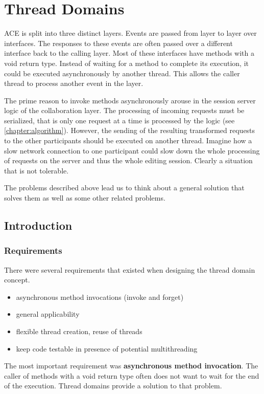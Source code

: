 \chapter{Thread Domains}

ACE is split into three distinct layers. Events are passed from layer to
layer over interfaces. The responses to these events are often passed over
a different interface back to the calling layer. Most of these interfaces
have methods with a void return type. Instead of waiting for a method
to complete its execution, it could be executed asynchronously by
another thread. This allows the caller thread to process another event
in the layer.

The prime reason to invoke methods asynchronously arouse in the session server
logic of the collaboration layer. The processing of incoming requests
must be serialized, that is only one request at a time is processed by
the logic (see \ref{chapter:algorithm}). However, the sending of the
resulting transformed requests to the other participants should be executed
on another thread. Imagine how a slow network connection to one participant
could slow down the whole processing of requests on the server and thus
the whole editing session. Clearly a situation that is not tolerable.

The problems described above lead us to think about a general solution that 
solves them as well as some other related problems.



\section{Introduction}

\subsection{Requirements}
There were several requirements that existed when designing the thread
domain concept.

\begin{itemize}
 \item asynchronous method invocations (invoke and forget)
 \item general applicability
 \item flexible thread creation, reuse of threads
 \item keep code testable in presence of potential multithreading
\end{itemize}

The most important requirement was \textbf{asynchronous method invocation}. 
The caller of methods with a void return type often does not want to wait
for the end of the execution. Thread domains provide a solution to that
problem.

